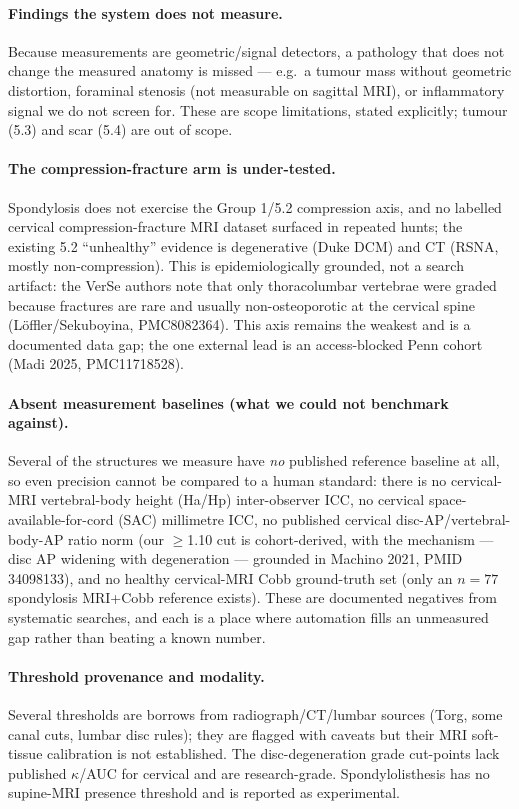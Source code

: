 \paragraph{Findings the system does not measure.} Because measurements are geometric/signal detectors, a
pathology that does not change the measured anatomy is missed --- e.g.\ a tumour mass without geometric
distortion, foraminal stenosis (not measurable on sagittal MRI), or inflammatory signal we do not screen
for. These are scope limitations, stated explicitly; tumour (5.3) and scar (5.4) are out of scope.

\paragraph{The compression-fracture arm is under-tested.} Spondylosis does not exercise the Group 1/5.2
compression axis, and no labelled cervical compression-fracture MRI dataset surfaced in repeated hunts;
the existing 5.2 ``unhealthy'' evidence is degenerative (Duke DCM) and CT (RSNA, mostly non-compression).
This is epidemiologically grounded, not a search artifact: the VerSe authors note that only
thoracolumbar vertebrae were graded because fractures are rare and usually non-osteoporotic at the
cervical spine (L\"offler/Sekuboyina, PMC8082364). This axis remains the weakest and is a documented data
gap; the one external lead is an access-blocked Penn cohort (Madi 2025, PMC11718528).

\paragraph{Absent measurement baselines (what we could not benchmark against).} Several of the structures
we measure have \emph{no} published reference baseline at all, so even precision cannot be compared to a
human standard: there is no cervical-MRI vertebral-body height (Ha/Hp) inter-observer ICC, no cervical
space-available-for-cord (SAC) millimetre ICC, no published cervical disc-AP/vertebral-body-AP ratio
norm (our $\geq$1.10 cut is cohort-derived, with the mechanism --- disc AP widening with degeneration ---
grounded in Machino 2021, PMID 34098133), and no healthy cervical-MRI Cobb ground-truth set (only an
$n{=}77$ spondylosis MRI+Cobb reference exists). These are documented negatives from systematic searches,
and each is a place where automation fills an unmeasured gap rather than beating a known number.

\paragraph{Threshold provenance and modality.} Several thresholds are borrows from radiograph/CT/lumbar
sources (Torg, some canal cuts, lumbar disc rules); they are flagged with caveats but their MRI
soft-tissue calibration is not established. The disc-degeneration grade cut-points lack published
$\kappa$/AUC for cervical and are research-grade. Spondylolisthesis has no supine-MRI presence threshold
and is reported as experimental.

